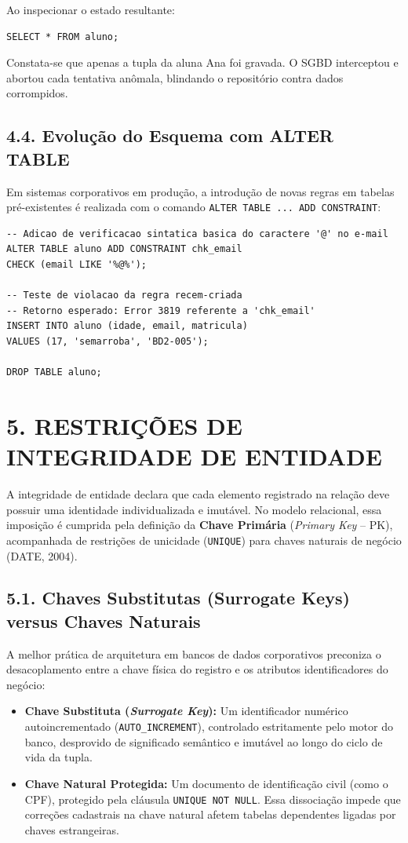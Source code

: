 Ao inspecionar o estado resultante:
\begin{lstlisting}
SELECT * FROM aluno;
\end{lstlisting}
Constata-se que apenas a tupla da aluna Ana foi gravada. O SGBD interceptou e abortou cada tentativa anômala, blindando o repositório contra dados corrompidos.

\subsection*{4.4. Evolução do Esquema com ALTER TABLE}

Em sistemas corporativos em produção, a introdução de novas regras em tabelas pré-existentes é realizada com o comando \texttt{ALTER TABLE ... ADD CONSTRAINT}:

\begin{lstlisting}
-- Adicao de verificacao sintatica basica do caractere '@' no e-mail
ALTER TABLE aluno ADD CONSTRAINT chk_email
CHECK (email LIKE '%@%');

-- Teste de violacao da regra recem-criada
-- Retorno esperado: Error 3819 referente a 'chk_email'
INSERT INTO aluno (idade, email, matricula)
VALUES (17, 'semarroba', 'BD2-005');

DROP TABLE aluno;
\end{lstlisting}

\newpage

\section*{5. RESTRIÇÕES DE INTEGRIDADE DE ENTIDADE}

A integridade de entidade declara que cada elemento registrado na relação deve possuir uma identidade individualizada e imutável. No modelo relacional, essa imposição é cumprida pela definição da \textbf{Chave Primária} (\textit{Primary Key} -- PK), acompanhada de restrições de unicidade (\texttt{UNIQUE}) para chaves naturais de negócio (DATE, 2004).

\subsection*{5.1. Chaves Substitutas (Surrogate Keys) versus Chaves Naturais}

A melhor prática de arquitetura em bancos de dados corporativos preconiza o desacoplamento entre a chave física do registro e os atributos identificadores do negócio:
\begin{itemize}
    \item \textbf{Chave Substituta (\textit{Surrogate Key}):} Um identificador numérico autoincrementado (\texttt{AUTO\_INCREMENT}), controlado estritamente pelo motor do banco, desprovido de significado semântico e imutável ao longo do ciclo de vida da tupla.
    \item \textbf{Chave Natural Protegida:} Um documento de identificação civil (como o CPF), protegido pela cláusula \texttt{UNIQUE NOT NULL}. Essa dissociação impede que correções cadastrais na chave natural afetem tabelas dependentes ligadas por chaves estrangeiras.
\end{itemize}

